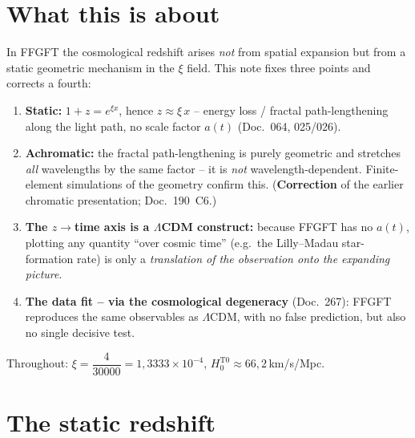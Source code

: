 
\section*{What this is about}

In FFGFT the cosmological redshift arises \emph{not} from spatial expansion but from
a static geometric mechanism in the $\xi$ field. This note fixes three points and
corrects a fourth:

\begin{enumerate}
  \item \textbf{Static:} $1+z = e^{\xi x}$, hence $z \approx \xi\,x$ -- energy loss
        / fractal path-lengthening along the light path, no scale factor $a(t)$
        (Doc.~064, 025/026).
  \item \textbf{Achromatic:} the fractal path-lengthening is purely geometric and
        stretches \emph{all} wavelengths by the same factor -- it is \emph{not}
        wavelength-dependent. Finite-element simulations of the geometry confirm this.
        (\textbf{Correction} of the earlier chromatic presentation; Doc.~190~C6.)
  \item \textbf{The $z\to$time axis is a $\Lambda$CDM construct:} because FFGFT has
        no $a(t)$, plotting any quantity \enquote{over cosmic time} (e.g.\ the
        Lilly--Madau star-formation rate) is only a \emph{translation of the
        observation onto the expanding picture}.
  \item \textbf{The data fit -- via the cosmological degeneracy} (Doc.~267): FFGFT
        reproduces the same observables as $\Lambda$CDM, with no false prediction,
        but also no single decisive test.
\end{enumerate}

\medskip
Throughout: $\xi = \dfrac{4}{30000} = 1{,}3333\times10^{-4}$,
$H_0^{\text{T0}} \approx 66{,}2$\,km/s/Mpc.

\section{The static redshift}

